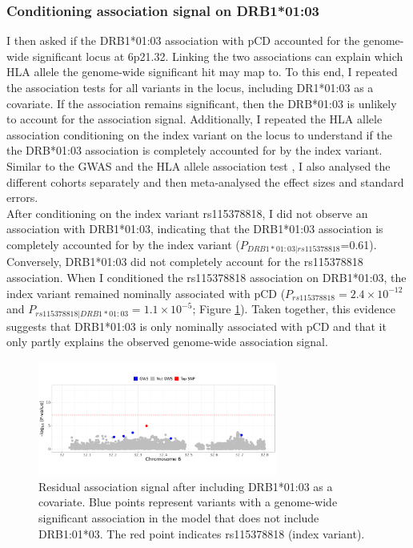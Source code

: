 \subsubsection{Conditioning association signal on DRB1*01:03}
I then asked if the DRB1*01:03 association with pCD accounted for the genome-wide significant locus at 6p21.32. Linking the two associations can explain which HLA allele the genome-wide significant hit may map to. To this end, I repeated the association tests for all variants in the locus, including DR1*01:03 as a covariate. If the association remains significant, then the DRB*01:03 is unlikely to account for the association signal. Additionally, I repeated the HLA allele association conditioning on the index variant on the locus to understand if the the DRB*01:03 association is completely accounted for by the index variant. Similar to the GWAS and the HLA allele association test , I also analysed the different cohorts separately and then meta-analysed the effect sizes and standard errors.\\


After conditioning on the index variant rs115378818, I did not observe an association with DRB1*01:03, indicating that the  DRB1*01:03 association is completely accounted for by the index variant ($P_{DRB1*01:03|rs115378818}$=0.61). Conversely, DRB1*01:03 did not completely account for the rs115378818 association. When I conditioned the rs115378818 association on DRB1*01:03, the index variant remained nominally associated with pCD ($P_{rs115378818}=2.4\times10^{-12}$ and  $P_{rs115378818|DRB1*01:03}=1.1\times10^{-5}$; Figure \ref{fig:residual_assoc_plot}). Taken together, this evidence suggests that  DRB1*01:03 is only nominally associated with pCD and that it only partly explains the observed genome-wide association signal. 

 
\begin{figure}[H] 
  \centering    
  \includegraphics[width=0.7\textwidth]{Vector/cond_regional_assoc_plot}
  \caption[Figure]{Residual association signal after including DRB1*01:03 as a covariate. Blue points represent variants with a genome-wide significant association in the model that does not include DRB1:01*03. The red point indicates rs115378818 (index variant).}
  \label{fig:residual_assoc_plot}
  \end{figure}

